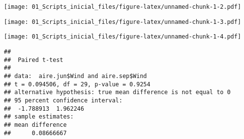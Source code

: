 \documentclass[
]{article}
\newenvironment{Shaded}{\begin{snugshade}}{\end{snugshade}}
\newcommand{\AttributeTok}[1]{\textcolor[rgb]{0.13,0.29,0.53}{#1}}
\newcommand{\CommentTok}[1]{\textcolor[rgb]{0.56,0.35,0.01}{\textit{#1}}}
\newcommand{\DecValTok}[1]{\textcolor[rgb]{0.00,0.00,0.81}{#1}}
\newcommand{\FloatTok}[1]{\textcolor[rgb]{0.00,0.00,0.81}{#1}}
\newcommand{\FunctionTok}[1]{\textcolor[rgb]{0.13,0.29,0.53}{\textbf{#1}}}
\newcommand{\NormalTok}[1]{#1}
\newcommand{\OtherTok}[1]{\textcolor[rgb]{0.56,0.35,0.01}{#1}}
\newcommand{\SpecialCharTok}[1]{\textcolor[rgb]{0.81,0.36,0.00}{\textbf{#1}}}
\newcommand{\StringTok}[1]{\textcolor[rgb]{0.31,0.60,0.02}{#1}}
\begin{document}
\texttt{[image: 01\_Scripts\_inicial\_files/figure-latex/unnamed-chunk-1-2.pdf]}

\begin{Shaded}
\end{Shaded}

\texttt{[image: 01\_Scripts\_inicial\_files/figure-latex/unnamed-chunk-1-3.pdf]}

\begin{Shaded}
\end{Shaded}

\texttt{[image: 01\_Scripts\_inicial\_files/figure-latex/unnamed-chunk-1-4.pdf]}

\begin{Shaded}
\end{Shaded}

\begin{verbatim}
## 
##  Paired t-test
## 
## data:  aire.jun$Wind and aire.sep$Wind
## t = 0.094506, df = 29, p-value = 0.9254
## alternative hypothesis: true mean difference is not equal to 0
## 95 percent confidence interval:
##  -1.788913  1.962246
## sample estimates:
## mean difference 
##      0.08666667
\end{verbatim}
\end{document}
